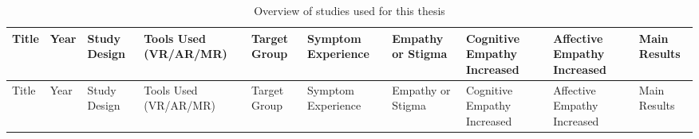 \begin{landscape}
    \scriptsize
    \begin{longtable}{|p{2.8cm}|p{0.6cm}|p{1.8cm}|p{1.2cm}|p{1.2cm}|p{2cm}|p{1.2cm}|p{1.2cm}|p{1.2cm}|p{3cm}|}
    \caption{Overview of studies used for this thesis} \label{tab:studies} \\
    \hline
    Title & Year & Study Design & Tools Used (VR/AR/MR) & Target Group & Symptom Experience & Empathy or Stigma & Cognitive Empathy Increased & Affective Empathy Increased & Main Results \\
    \hline
    \endfirsthead
    \hline
    Title & Year & Study Design & Tools Used (VR/AR/MR) & Target Group & Symptom Experience & Empathy or Stigma & Cognitive Empathy Increased & Affective Empathy Increased & Main Results \\
    \hline
    \endhead
    

\end{longtable}
\end{landscape}

